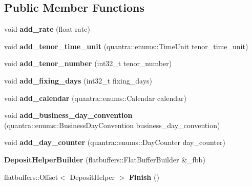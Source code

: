 \subsection*{Public Member Functions}
\begin{DoxyCompactItemize}
\item 
\mbox{\label{structquantra_1_1DepositHelperBuilder_a79b2b31418d5d8f16dd14a4cd9fbdc3b}} 
void {\bfseries add\+\_\+rate} (float rate)
\item 
\mbox{\label{structquantra_1_1DepositHelperBuilder_a597eb7c4c3523c1f88e7886009de278a}} 
void {\bfseries add\+\_\+tenor\+\_\+time\+\_\+unit} (quantra\+::enums\+::\+Time\+Unit tenor\+\_\+time\+\_\+unit)
\item 
\mbox{\label{structquantra_1_1DepositHelperBuilder_addca058093b749acea96edbee952a309}} 
void {\bfseries add\+\_\+tenor\+\_\+number} (int32\+\_\+t tenor\+\_\+number)
\item 
\mbox{\label{structquantra_1_1DepositHelperBuilder_a8bce4ef527eedf53dd4331585245f5d9}} 
void {\bfseries add\+\_\+fixing\+\_\+days} (int32\+\_\+t fixing\+\_\+days)
\item 
\mbox{\label{structquantra_1_1DepositHelperBuilder_afd6ca6e2462e060048f772828987ff65}} 
void {\bfseries add\+\_\+calendar} (quantra\+::enums\+::\+Calendar calendar)
\item 
\mbox{\label{structquantra_1_1DepositHelperBuilder_a1cee024625a5996bf03ed3703936b527}} 
void {\bfseries add\+\_\+business\+\_\+day\+\_\+convention} (quantra\+::enums\+::\+Business\+Day\+Convention business\+\_\+day\+\_\+convention)
\item 
\mbox{\label{structquantra_1_1DepositHelperBuilder_a03761cc789d2041e721c896fcfdf6a82}} 
void {\bfseries add\+\_\+day\+\_\+counter} (quantra\+::enums\+::\+Day\+Counter day\+\_\+counter)
\item 
\mbox{\label{structquantra_1_1DepositHelperBuilder_a841d39d90620be0738d1556a8b935479}} 
{\bfseries Deposit\+Helper\+Builder} (flatbuffers\+::\+Flat\+Buffer\+Builder \&\+\_\+fbb)
\item 
\mbox{\label{structquantra_1_1DepositHelperBuilder_acbfb792f8983d78d8f719e20aaa61023}} 
flatbuffers\+::\+Offset$<$ Deposit\+Helper $>$ {\bfseries Finish} ()
\end{DoxyCompactItemize}
